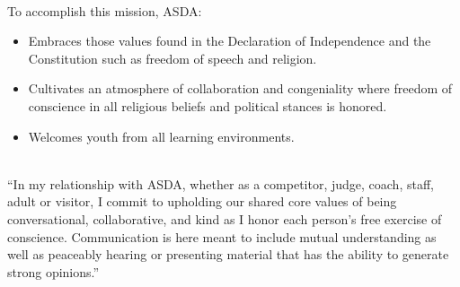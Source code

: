 \documentclass[11pt]{memoir}    %
\def\lowspacing{9pt}
\def\regspacing{19pt}
\begin{document}
{\setcounter{tocdepth}{2}
\hypersetup{linkcolor=black}
\tableofcontents
}

\newpage

\label{sec:MissionStatement}
\noindent{}\vspace{\regspacing}\\
{To accomplish this mission, ASDA:}\vspace{\lowspacing}
\begin{itemize}
    \item Embraces those values found in the Declaration of Independence and the Constitution such as freedom of speech and religion.
    \item Cultivates an atmosphere of collaboration and congeniality where freedom of conscience in all religious beliefs and political stances is honored.
    \item Welcomes youth from all learning environments.
\end{itemize}\vspace{\regspacing}

\label{sec:CoreValues}
\noindent{}\vspace{\regspacing}\\
{“In my relationship with ASDA, whether as a competitor, judge, coach, staff, adult or visitor, I commit to upholding our shared core values of being conversational, collaborative, and kind as I honor each person’s free exercise of conscience. Communication is here meant to include mutual understanding as well as peaceably hearing or presenting material that has the ability to generate strong opinions.”}\vspace{\lowspacing}\\
\end{document}
